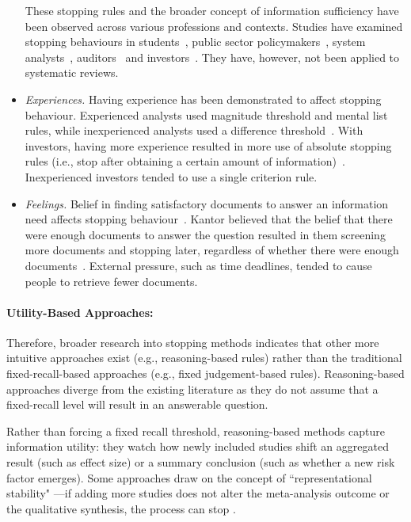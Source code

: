 \documentclass[10pt,oneside]{book}
\begin{document}
\begin{itemize}
    These stopping rules and the broader concept of information sufficiency have been observed across various professions and contexts. Studies have examined stopping behaviours in students~\cite{browne_stopping_2005, browne_cognitive_2007, dedema_examination_2019, nickles_judgment-based_1995, creighton_university_cognitive_2017, gerhart_generalizing_2020}, public sector policymakers~\cite{berryman_what_2006}, system analysts~\cite{pitts_stopping_2004}, auditors~\cite{poziemski_when_2019} and investors~\cite{pennington_how_2016}. They have, however, not been applied to systematic reviews.
 
    \item \emph{Experiences.} Having experience has been demonstrated to affect stopping behaviour. Experienced analysts used magnitude threshold and mental list rules, while inexperienced analysts used a difference threshold~\cite{pitts_stopping_2004}. With investors, having more experience resulted in more use of absolute stopping rules (i.e., stop after obtaining a certain amount of information)~\cite{pennington_how_2016}. Inexperienced investors tended to use a single criterion rule.

    \item \emph{Feelings.} Belief in finding satisfactory documents to answer an information need affects stopping behaviour~\cite{wu_online_2014}. Kantor believed that the belief that there were enough documents to answer the question resulted in them screening more documents and stopping later, regardless of whether there were enough documents~\cite{kantor_model_1987}. External pressure, such as time deadlines, tended to cause people to retrieve fewer documents.

\end{itemize}

\paragraph{Utility-Based Approaches:}
Therefore, broader research into stopping methods indicates that other more intuitive approaches exist (e.g., reasoning-based rules) rather than the traditional fixed-recall-based approaches (e.g., fixed judgement-based rules). Reasoning-based approaches diverge from the existing literature as they do not assume that a fixed-recall level will result in an answerable question.

Rather than forcing a fixed recall threshold, reasoning-based methods capture information utility: they watch how newly included studies shift an aggregated result (such as effect size) or a summary conclusion (such as whether a new risk factor emerges). Some approaches draw on the concept of ``representational stability" \cite{nickles_judgment-based_1995}—if adding more studies does not alter the meta-analysis outcome or the qualitative synthesis, the process can stop \cite{ilani_analysis_2024}.
\end{document}
